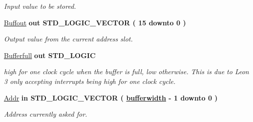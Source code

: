 \begin{DoxyCompactItemize}
\begin{DoxyCompactList}\small\item\em Input value to be stored. \end{DoxyCompactList}\item 
\hypertarget{classADC__buffer_ae32ca2a63fbe2fd9bbe609ba799ce989}{\hyperlink{classADC__buffer_ae32ca2a63fbe2fd9bbe609ba799ce989}{Buffout}  {\bfseries {\bfseries \textcolor{vhdlkeyword}{out}\textcolor{vhdlchar}{ }}} {\bfseries \textcolor{comment}{S\-T\-D\-\_\-\-L\-O\-G\-I\-C\-\_\-\-V\-E\-C\-T\-O\-R}\textcolor{vhdlchar}{ }\textcolor{vhdlchar}{(}\textcolor{vhdlchar}{ }\textcolor{vhdlchar}{ } \textcolor{vhdldigit}{15} \textcolor{vhdlchar}{ }\textcolor{vhdlchar}{ }\textcolor{vhdlchar}{ }\textcolor{vhdlkeyword}{downto}\textcolor{vhdlchar}{ }\textcolor{vhdlchar}{ }\textcolor{vhdlchar}{ } \textcolor{vhdldigit}{0} \textcolor{vhdlchar}{ }\textcolor{vhdlchar}{)}\textcolor{vhdlchar}{ }} }\label{classADC__buffer_ae32ca2a63fbe2fd9bbe609ba799ce989}

\begin{DoxyCompactList}\small\item\em Output value from the current address slot. \end{DoxyCompactList}\item 
\hypertarget{classADC__buffer_a4f849708d4274223b88930c2568f405c}{\hyperlink{classADC__buffer_a4f849708d4274223b88930c2568f405c}{Bufferfull}  {\bfseries {\bfseries \textcolor{vhdlkeyword}{out}\textcolor{vhdlchar}{ }}} {\bfseries \textcolor{comment}{S\-T\-D\-\_\-\-L\-O\-G\-I\-C}\textcolor{vhdlchar}{ }} }\label{classADC__buffer_a4f849708d4274223b88930c2568f405c}

\begin{DoxyCompactList}\small\item\em high for one clock cycle when the buffer is full, low otherwise. This is due to Leon 3 only accepting interrupts being high for one clock cycle. \end{DoxyCompactList}\item 
\hypertarget{classADC__buffer_ab93f1c6757ecccdcea2252108bb7caff}{\hyperlink{classADC__buffer_ab93f1c6757ecccdcea2252108bb7caff}{Addr}  {\bfseries {\bfseries \textcolor{vhdlkeyword}{in}\textcolor{vhdlchar}{ }}} {\bfseries \textcolor{comment}{S\-T\-D\-\_\-\-L\-O\-G\-I\-C\-\_\-\-V\-E\-C\-T\-O\-R}\textcolor{vhdlchar}{ }\textcolor{vhdlchar}{(}\textcolor{vhdlchar}{ }\textcolor{vhdlchar}{ }{\bfseries \hyperlink{classADC__buffer_a2f94b7b31a8914ee23be5e000f89e921}{bufferwidth}} \textcolor{vhdlchar}{ }\textcolor{vhdlchar}{-\/}\textcolor{vhdlchar}{ } \textcolor{vhdldigit}{1} \textcolor{vhdlchar}{ }\textcolor{vhdlchar}{ }\textcolor{vhdlchar}{ }\textcolor{vhdlkeyword}{downto}\textcolor{vhdlchar}{ }\textcolor{vhdlchar}{ }\textcolor{vhdlchar}{ } \textcolor{vhdldigit}{0} \textcolor{vhdlchar}{ }\textcolor{vhdlchar}{)}\textcolor{vhdlchar}{ }} }\label{classADC__buffer_ab93f1c6757ecccdcea2252108bb7caff}

\begin{DoxyCompactList}\small\item\em Address currently asked for. \end{DoxyCompactList}\end{DoxyCompactItemize}


